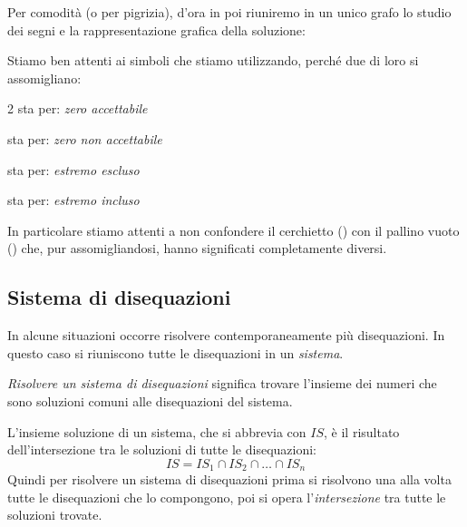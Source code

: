 \begin{osservazione}{}{} 
Per comodità (o per pigrizia), d'ora in poi riuniremo in un unico grafo 
lo studio dei segni e la rappresentazione grafica della soluzione: 

% 
{\soluzionefratta}
\end{osservazione}

Stiamo ben attenti ai simboli che stiamo utilizzando, perché due di loro si 
assomigliano:
\begin{htmulticols}{2}
%  
sta per: \emph{zero accettabile}

%  
sta per: \emph{zero non accettabile}

%  
sta per: \emph{estremo escluso}

%  
sta per: \emph{estremo incluso}
\end{htmulticols}

In particolare stiamo attenti a non confondere il cerchietto 
() 
con il pallino vuoto () che, pur assomigliandosi, 
hanno significati completamente diversi.

\subsection{Sistema di disequazioni}
\label{sec:dis_sistemi}
In alcune situazioni occorre risolvere contemporaneamente più disequazioni.
In questo caso si riuniscono tutte le disequazioni in un \emph{sistema}. 

\emph{Risolvere un sistema di disequazioni} significa trovare
l'insieme dei numeri che sono soluzioni comuni alle disequazioni del 
sistema.

L'insieme soluzione di un sistema, che si abbrevia con \(IS\), è 
il risultato dell'intersezione tra le soluzioni di tutte le disequazioni:
\[IS = IS_{1} \cap IS_{2} \cap \dots \cap IS_{n}\]
Quindi per risolvere un sistema di disequazioni prima si risolvono una alla 
volta tutte le disequazioni che lo compongono, 
poi si opera l'\emph{intersezione} tra tutte le soluzioni trovate. 

